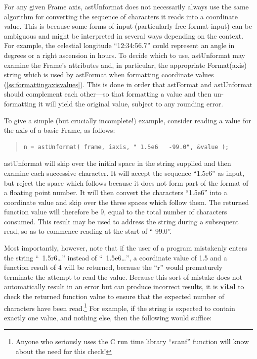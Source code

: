 \documentclass[twoside,11pt]{article}
\newcommand{\htmlref}[2]{#1}
\newcommand{\secref}[1]{\S\ref{#1}}
\renewcommand{\secref}[1]{\ref{#1}}
\begin{document}
For any given Frame axis, astUnformat does not necessarily always use
the same algorithm for converting the sequence of characters it reads
into a coordinate value. This is because some forms of input
(particularly free-format input) can be ambiguous and might be
interpreted in several ways depending on the context. For example, the
celestial longitude ``12:34:56.7'' could represent an angle in degrees
or a right ascension in hours. To decide which to use, astUnformat may
examine the Frame's attributes and, in particular, the appropriate
\htmlref{Format(axis)}{Formataxis} string which is used by astFormat when formatting
coordinate values (\secref{ss:formattingaxisvalues}). This is done in
order that astFormat and astUnformat should complement each other---so
that formatting a value and then un-formatting it will yield the
original value, subject to any rounding error.

To give a simple (but crucially incomplete!) example, consider reading
a value for the axis of a basic Frame, as follows:

\begin{quote}
\small
\begin{verbatim}
n = astUnformat( frame, iaxis, " 1.5e6   -99.0", &value );
\end{verbatim}
\normalsize
\end{quote}

astUnformat will skip over the initial space in the string supplied
and then examine each successive character. It will accept the
sequence ``1.5e6'' as input, but reject the space which follows
because it does not form part of the format of a floating point
number. It will then convert the characters ``1.5e6'' into a
coordinate value and skip over the three spaces which follow them. The
returned function value will therefore be 9, equal to the total number
of characters consumed. This result may be used to address the string
during a subsequent read, so as to commence reading at the start of
``-99.0''.

Most importantly, however, note that if the user of a program
mistakenly enters the string ``~1.5r6\ldots'' instead of
``~1.5e6\ldots'', a coordinate value of 1.5 and a function result of 4
will be returned, because the ``r'' would prematurely terminate the
attempt to read the value. Because this sort of mistake does not
automatically result in an error but can produce incorrect results, it
is {\bf{vital}} to check the returned function value to ensure that
the expected number of characters have been read.\footnote{Anyone who
seriously uses the C run time library ``scanf'' function will know
about the need for this check!}  For example, if the string is
expected to contain exactly one value, and nothing else, then the
following would suffice:
\end{document}
